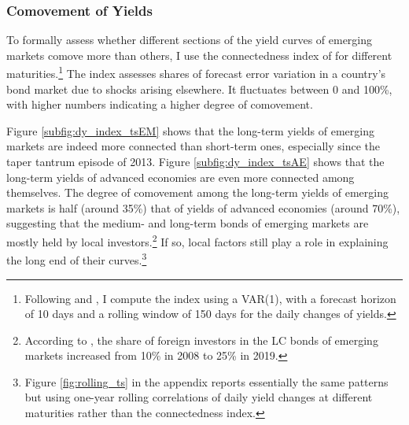 {%


\subsubsection{Comovement of Yields}
To formally assess whether different sections of the yield curves of emerging markets comove more than others, I use the connectedness index of \cite{DieboldYilmaz:2014} for different maturities.\footnote{ Following \cite{ACDM:2019} and \cite{BostanciYilmaz:2020}, I compute the index using a VAR(1), with a forecast horizon of 10 days and a rolling window of 150 days for the daily changes of yields.} The index assesses shares of forecast error variation in a country's bond market due to shocks arising elsewhere. 
It fluctuates between 0 and 100\%, with higher numbers indicating a higher degree of comovement. 

Figure \ref{subfig:dy_index_tsEM} shows that the long-term yields of emerging markets are indeed more connected than short-term ones, especially since the taper tantrum episode of 2013. 
Figure \ref{subfig:dy_index_tsAE} shows that the long-term yields of advanced economies are even more connected among themselves. The degree of comovement among the long-term yields of emerging markets is half (around 35\%) that of yields of advanced economies (around 70\%),
suggesting that the medium- and long-term bonds of emerging markets are mostly held by local investors.\footnote{ According to \cite{KolasaWesolowski:2020}, the share of foreign investors in the LC bonds of emerging markets increased from 10\% in 2008 to 25\% in 2019.}
If so, local factors still play a role in explaining the long end of their curves.\footnote{ Figure \ref{fig:rolling_ts} in the appendix reports essentially the same patterns but using one-year rolling correlations of daily yield changes at different maturities rather than the connectedness index.}

}
